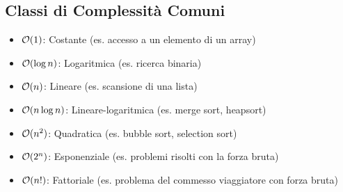 \subsection*{Classi di Complessità Comuni}
\begin{itemize}
    \item $\mathcal{O}(1)$: Costante (es. accesso a un elemento di un array)
    \item $\mathcal{O}(\log n)$: Logaritmica (es. ricerca binaria)
    \item $\mathcal{O}(n)$: Lineare (es. scansione di una lista)
    \item $\mathcal{O}(n \log n)$: Lineare-logaritmica (es. merge sort, heapsort)
    \item $\mathcal{O}(n^2)$: Quadratica (es. bubble sort, selection sort)
    \item $\mathcal{O}(2^n)$: Esponenziale (es. problemi risolti con la forza bruta)
    \item $\mathcal{O}(n!)$: Fattoriale (es. problema del commesso viaggiatore con forza bruta)
\end{itemize}
